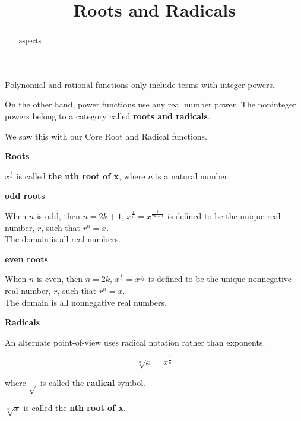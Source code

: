 \documentclass{ximera}
\title{Roots and Radicals}
\begin{document}
\begin{abstract}
aspects
\end{abstract}
\maketitle





Polynomial and rational functions only include terms with integer powers. 


On the other hand, power functions use any real number power.  The noninteger powers belong to a category called \textbf{roots and radicals}.

We saw this with our Core Root and Radical functions.



\begin{definition} \textbf{\textcolor{green!50!black}{Roots}}

$x^{\tfrac{1}{n}}$ is called \textbf{the nth root of x}, where $n$ is a natural number.




\textbf{odd roots}

When $n$ is odd, then $n = 2k+1$, $x^{\tfrac{1}{n}} = x^{\tfrac{1}{2k+1}}$ is defined to be the unique real number, $r$, such that $r^n = x$. \\
The domain is all real numbers.




\textbf{even roots}

When $n$ is even, then $n = 2k$, $x^{\tfrac{1}{n}} = x^{\tfrac{1}{2k}}$ is defined to be the unique nonnegative real number, $r$, such that $r^n = x$. \\
The domain is all nonnegative real numbers.


\end{definition}



\begin{definition} \textbf{\textcolor{green!50!black}{Radicals}}

An alternate point-of-view uses radical notation rather than exponents.

\[   \sqrt[n]{x} =  x^{\tfrac{1}{n}}     \]

where $\sqrt{ }$ is called the \textbf{radical} symbol.


$\sqrt[n]{x}$ is called the \textbf{nth root of x}.

\end{definition}
\end{document}
